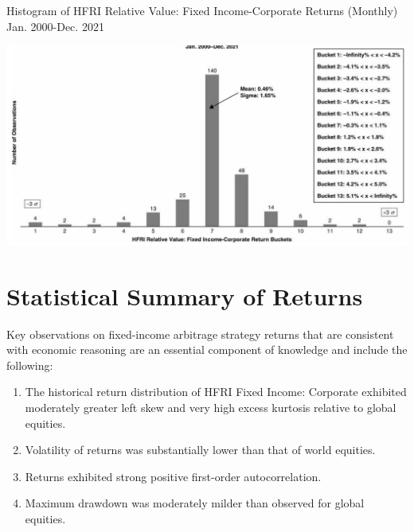 \documentclass[11pt]{article}
\begin{document}
Histogram of HFRI Relative Value: Fixed Income-Corporate Returns (Monthly) Jan. 2000-Dec. 2021

\begin{center}
\includegraphics[max width=\textwidth]{2024_04_09_56e5743515a08e209ea4g-6(1)}
\end{center}

\section*{Statistical Summary of Returns}
Key observations on fixed-income arbitrage strategy returns that are consistent with economic reasoning are an essential component of knowledge and include the following:

\begin{enumerate}
  \item The historical return distribution of HFRI Fixed Income: Corporate exhibited moderately greater left skew and very high excess kurtosis relative to global equities.

  \item Volatility of returns was substantially lower than that of world equities.

  \item Returns exhibited strong positive first-order autocorrelation.

  \item Maximum drawdown was moderately milder than observed for global equities.

\end{enumerate}
\end{document}

